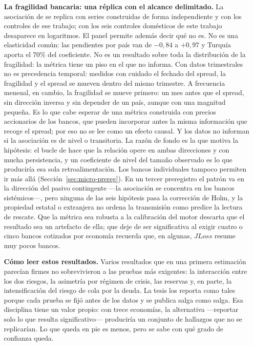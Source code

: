 \textbf{La fragilidad bancaria: una réplica con el alcance delimitado.} La asociación de \citet{Chari2024b} se replica con series construidas de forma independiente y con los controles de ese trabajo; con los seis controles domésticos de este trabajo desaparece en logaritmos. El panel permite además decir qué no es. No es una elasticidad común: las pendientes por país van de $-0{,}84$ a $+0{,}97$ y Turquía aporta el 70\% del coeficiente. No es un resultado sobre toda la distribución de la fragilidad: la métrica tiene un piso en el que no informa. Con datos trimestrales no es precedencia temporal: medidos con cuidado el fechado del spread, la fragilidad y el spread se mueven dentro del mismo trimestre. A frecuencia mensual, en cambio, la fragilidad se mueve primero: un mes antes que el spread, sin dirección inversa y sin depender de un país, aunque con una magnitud pequeña. Es lo que cabe esperar de una métrica construida con precios accionarios de los bancos, que pueden incorporar antes la misma información que recoge el spread; por eso no se lee como un efecto causal. Y los datos no informan si la asociación es de nivel o transitoria. La razón de fondo es la que motiva la hipótesis: el bucle de \citet{FarhiTirole2018b} hace que la relación opere en ambas direcciones y con mucha persistencia, y un coeficiente de nivel del tamaño observado es lo que produciría esa sola retroalimentación. Los bancos individuales tampoco permiten ir más allá (Sección~\ref{sec:micro-prereg}). En un tercer preregistro el patrón va en la dirección del pasivo contingente ---la asociación se concentra en los bancos sistémicos---, pero ninguna de las seis hipótesis pasa la corrección de Holm, y la propiedad estatal o extranjera no ordena la transmisión como predice la lectura de rescate. Que la métrica sea robusta a la calibración del motor descarta que el resultado sea un artefacto de ella; que deje de ser significativa al exigir cuatro o cinco bancos cotizados por economía recuerda que, en algunas, $JLoss$ resume muy pocos bancos.

\textbf{Cómo leer estos resultados.} Varios resultados que en una primera estimación parecían firmes no sobrevivieron a las pruebas más exigentes: la interacción entre los dos riesgos, la asimetría por régimen de crisis, las reservas y, en parte, la intensificación del riesgo de cola por la deuda. La tesis los reporta como tales porque cada prueba se fijó antes de los datos y se publica salga como salga. Esa disciplina tiene un valor propio: con trece economías, la alternativa ---reportar solo lo que resulta significativo--- produciría un conjunto de hallazgos que no se replicarían. Lo que queda en pie es menos, pero se sabe con qué grado de confianza queda.

